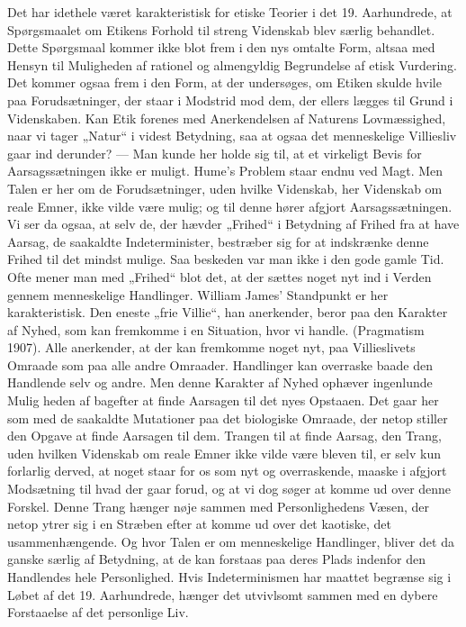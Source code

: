 \documentclass[12pt,a4paper,openany]{book}
\newcommand{\opage}[1]{\marginnote{\footnotesize\textit{[#1]}}}
\begin{document}
Det har idethele været karakteristisk for etiske Teorier i det 19.
Aarhundrede, at Spørgsmaalet om Etikens Forhold til streng Videnskab
blev særlig behandlet. Dette Spørgsmaal kommer ikke blot frem
i den nys omtalte Form, altsaa med Hensyn til Muligheden af rationel
og almengyldig Begrundelse af etisk Vurdering. Det kommer ogsaa
frem i den Form, at der undersøges, om Etiken skulde hvile paa
Forudsætninger, der staar i Modstrid mod dem, der ellers lægges til
Grund i Videnskaben. Kan Etik forenes med Anerkendelsen af Naturens
Lovmæssighed, naar vi tager „Natur“ i videst Betydning, saa
at ogsaa det menneskelige Villiesliv gaar ind derunder? --- Man
kunde her holde sig til, at et virkeligt Bevis for Aarsagssætningen
ikke er muligt. Hume’s Problem staar endnu ved Magt. Men Talen
er her om de Forudsætninger, uden hvilke Videnskab, her Videnskab
om reale Emner, ikke vilde være mulig; og til denne hører afgjort
Aarsagssætningen. Vi ser da ogsaa, at selv de, der hævder „Frihed“
i Betydning af Frihed fra at have Aarsag, de saakaldte Indeterminister,
bestræber sig for at indskrænke denne Frihed til det mindst
mulige. Saa beskeden var man ikke i den gode gamle Tid. Ofte mener
man med „Frihed“ blot det, at der sættes noget nyt ind i Verden
gennem menneskelige Handlinger. William James’ Standpunkt
er her karakteristisk. Den eneste „frie Villie“, han anerkender, beror
paa den Karakter af Nyhed, som kan fremkomme i en Situation,
hvor vi handle. (Pragmatism 1907). Alle anerkender, at der kan
fremkomme noget nyt, paa Villieslivets Omraade som paa alle andre
Omraader. Handlinger kan overraske baade den Handlende selv og
andre. Men denne Karakter af Nyhed ophæver ingenlunde Mulig%
\opage{73}heden af bagefter at finde Aarsagen til det nyes Opstaaen. Det gaar
her som med de saakaldte Mutationer paa det biologiske Omraade,
der netop stiller den Opgave at finde Aarsagen til dem. Trangen til at
finde Aarsag, den Trang, uden hvilken Videnskab om reale Emner
ikke vilde være bleven til, er selv kun forlarlig derved, at noget
staar for os som nyt og overraskende, maaske i afgjort Modsætning
til hvad der gaar forud, og at vi dog søger at komme ud over denne
Forskel. Denne Trang hænger nøje sammen med Personlighedens
Væsen, der netop ytrer sig i en Stræben efter at komme ud over det
kaotiske, det usammenhængende. Og hvor Talen er om menneskelige
Handlinger, bliver det da ganske særlig af Betydning, at de
kan forstaas paa deres Plads indenfor den Handlendes hele Personlighed.
Hvis Indeterminismen har maattet begrænse sig i Løbet
af det 19. Aarhundrede, hænger det utvivlsomt sammen med en
dybere Forstaaelse af det personlige Liv.
\end{document}
